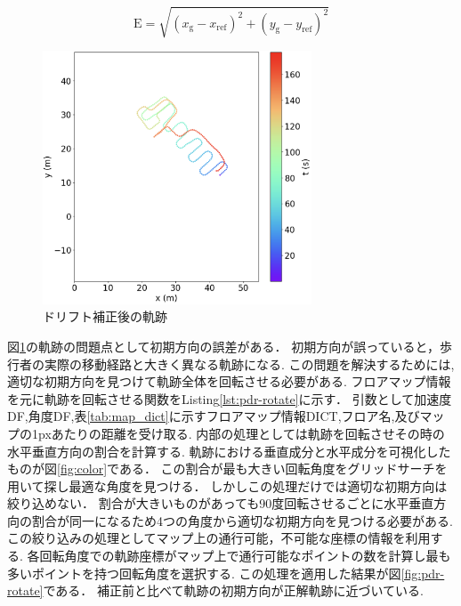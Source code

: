 \vspace{5mm} %
\begin{equation}
	\mathrm{E} = \sqrt{(x_{\mathrm{g}} - x_{\mathrm{ref}})^2 + (y_{\mathrm{g}} - y_{\mathrm{ref}})^2}
\end{equation}
\vspace{5mm} %

\begin{figure}[h]
	\centering
	\includegraphics[width=80mm]{image/pdr-remove-drift-two.jpg}
	\caption{ドリフト補正後の軌跡}    \label{fig:pdr-remove-drift}
\end{figure}


図\ref{fig:pdr-remove-drift}の軌跡の問題点として初期方向の誤差がある．
初期方向が誤っていると，歩行者の実際の移動経路と大きく異なる軌跡になる.
この問題を解決するためには,適切な初期方向を見つけて軌跡全体を回転させる必要がある.
フロアマップ情報を元に軌跡を回転させる関数をListing\ref{lst:pdr-rotate}に示す．
引数として加速度DF,角度DF,表\ref{tab:map_dict}に示すフロアマップ情報DICT,フロア名,及びマップの1pxあたりの距離を受け取る.
内部の処理としては軌跡を回転させその時の水平垂直方向の割合を計算する.
軌跡における垂直成分と水平成分を可視化したものが図\ref{fig:color}である．
この割合が最も大きい回転角度をグリッドサーチを用いて探し最適な角度を見つける．
しかしこの処理だけでは適切な初期方向は絞り込めない．
割合が大きいものがあっても90度回転させるごとに水平垂直方向の割合が同一になるため4つの角度から適切な初期方向を見つける必要がある.
この絞り込みの処理としてマップ上の通行可能，不可能な座標の情報を利用する.
各回転角度での軌跡座標がマップ上で通行可能なポイントの数を計算し最も多いポイントを持つ回転角度を選択する.
この処理を適用した結果が図\ref{fig:pdr-rotate}である．
補正前と比べて軌跡の初期方向が正解軌跡に近づいている.

